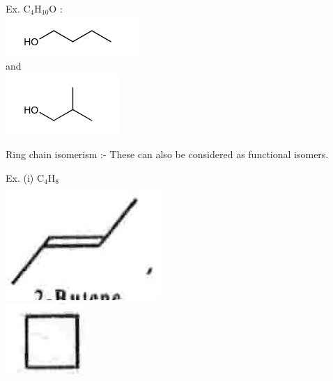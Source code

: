 \documentclass[10pt]{article}
\begin{document}
Ex. $\mathrm{C}_{4} \mathrm{H}_{10} \mathrm{O}$ :\\
\includegraphics{smile-9cc1f1c6d578b09612a3154305662da7c6190b88}\\
and\\
\includegraphics{smile-837026a011f131142f7c78e1d51ce8ef8e82432f}

Ring chain isomerism :- These can also be considered as functional isomers.

Ex. (i) $\mathrm{C}_{4} \mathrm{H}_{8}$\\
\includegraphics[max width=\textwidth, center]{2025_01_28_8470952b98110cec3aabg-039(1)}\\
\includegraphics[max width=\textwidth, center]{2025_01_28_8470952b98110cec3aabg-039(7)}
\end{document}
